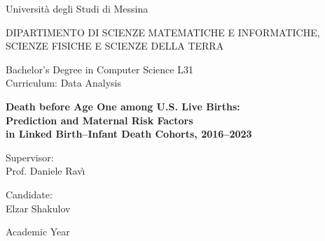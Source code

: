 \begin{titlepage}
\centering
{\Large Università degli Studi di Messina\par}
\vspace{1cm}
{\large DIPARTIMENTO DI SCIENZE MATEMATICHE E INFORMATICHE,\\
SCIENZE FISICHE E SCIENZE DELLA TERRA\par}
\vspace{0.5cm}
{\large Bachelor's Degree in Computer Science L31\\
Curriculum: Data Analysis\par}
\vspace{3cm}
{\huge\bfseries Death before Age One among U.S. Live Births:\\[0.3em]
Prediction and Maternal Risk Factors\\[0.3em]
in Linked Birth--Infant Death Cohorts, 2016--2023\par}
\vfill
\begin{minipage}[t]{0.45\textwidth}
\raggedright Supervisor:\\ Prof. Daniele Rav\`{\i}
\end{minipage}\hfill
\begin{minipage}[t]{0.45\textwidth}
\raggedleft Candidate:\\ Elzar Shakulov
\end{minipage}
\vspace{2cm}

Academic Year 
\end{titlepage}
